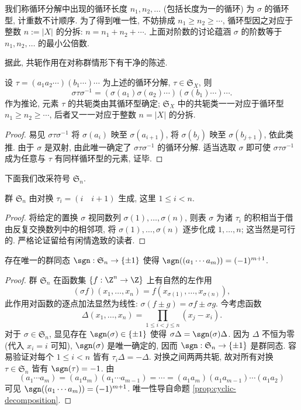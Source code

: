 我们称循环分解中出现的循环长度 $n_1, n_2, \ldots$ (包括长度为一的循环) 为 $\sigma$ 的循环型, 计重数不计顺序. 为了得到唯一性, 不妨排成 $n_1 \geq n_2 \geq \cdots$, 循环型因之对应于整数 $n := |X|$ 的分拆: $n = n_1 + n_2 + \cdots$. 上面对阶数的讨论蕴涵 $\sigma$ 的阶数等于 $n_1, n_2, \ldots$ 的最小公倍数. 

据此, 共轭作用在对称群情形下有干净的陈述.
\begin{lemma}\label{prop:cycle-type}
	设 $\tau = (a_1 a_2 \cdots) (b_1 \cdots) \cdots$ 为上述的循环分解, $\tau \in \mathfrak{S}_X$, 则
	\[ \sigma \tau \sigma^{-1} = (\sigma(a_1) \sigma(a_2) \cdots) (\sigma(b_1) \cdots) \cdots. \]
	作为推论, 元素 $\tau$ 的共轭类由其循环型确定; $\mathfrak{S}_X$ 中的共轭类一一对应于循环型 $n_1 \geq n_2 \geq \cdots$, 后者又一一对应于整数 $n = |X|$ 的分拆.
\end{lemma}
\begin{proof}
	易见 $\sigma \tau \sigma^{-1}$ 将 $\sigma(a_i)$ 映至 $\sigma(a_{i+1})$, 将 $\sigma(b_j)$ 映至 $\sigma(b_{j+1})$, 依此类推. 由于 $\sigma$ 是双射, 由此唯一确定了 $\sigma \tau \sigma^{-1}$ 的循环分解. 适当选取 $\sigma$ 即可使 $\sigma\tau\sigma^{-1}$ 成为任意与 $\tau$ 有同样循环型的元素, 证毕. 
\end{proof}

下面我们改采符号 $\mathfrak{S}_n$.
\begin{lemma}\label{prop:S_n-generation}
	群 $\mathfrak{S}_n$ 由对换 $\tau_i = (i \quad i+1)$ 生成, 这里 $1 \leq i < n$.
\end{lemma}
\begin{proof}
	将给定的置换 $\sigma$ 视同数列 $\sigma(1), \ldots, \sigma(n)$, 则表 $\sigma$ 为诸 $\tau_i$ 的积相当于借由反复交换数列中的相邻项, 将 $\sigma(1), \ldots, \sigma(n)$ 逐步化成 $1, \ldots, n$; 这当然是可行的. 严格论证留给有闲情逸致的读者.
\end{proof}

\begin{lemma}
	存在唯一的群同态 $\sgn: \mathfrak{S}_n \to \{\pm 1\}$ 使得 $\sgn((a_1 \cdots a_m)) = (-1)^{m+1}$.
\end{lemma}
\begin{proof}
	群 $\mathfrak{S}_n$ 在函数集 $\{ f: \Z^n \to \Z\}$ 上有自然的左作用
	\[ (\sigma f)(x_1, \ldots, x_n) = f(x_{\sigma(1)}, \ldots, x_{\sigma(n)}), \]
	此作用对函数的逐点加法显然为线性: $\sigma(f \pm g) = \sigma f \pm \sigma g$. 今考虑函数
	\[ \Delta(x_1, \ldots, x_n) = \prod_{1 \leq i < j \leq n} (x_j - x_i). \]
	对于 $\sigma \in \mathfrak{S}_n$, 显见存在 $\sgn(\sigma) \in \{\pm 1\}$ 使得 $\sigma \Delta = \sgn(\sigma)\Delta$. 因为 $\Delta$ 不恒为零 (代入 $x_i = i$ 可知), $\sgn(\sigma)$ 是唯一确定的, 因而 $\sgn: \mathfrak{S}_n \to \{\pm1 \}$ 是群同态. 容易验证对每个 $1 \leq i < n$ 皆有 $\tau_i \Delta = -\Delta$. 对换之间两两共轭, 故对所有对换 $\tau \in \mathfrak{S}_n$ 皆有 $\sgn(\tau)=-1$. 由
	\[(a_1 \cdots a_m) = (a_1 a_m) (a_1 \cdots a_{m-1}) = \cdots = (a_1 a_m) (a_1 a_{m-1}) \cdots (a_1 a_2) \]
	可见 $\sgn((a_1 \cdots a_m)) = (-1)^{m+1}$. 唯一性导自命题 \ref{prop:cyclic-decomposition}. 
\end{proof}

